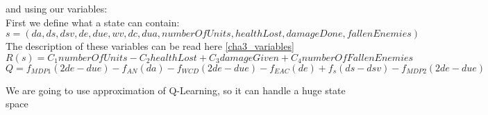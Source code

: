 and using our variables:\\
First we define what a state can contain:\\
$s = {(da, ds, dsv, de, due, wv, dc, dua, numberOfUnits, healthLost, damageDone, fallenEnemies)}$
The description of these variables can be read here \ref{cha3_variables}
$R(s) = C_1 numberOfUnits - C_2 healthLost +  C_3 damageGiven +  C_4 numberOfFallenEnemies$\\

$Q = f_{MDP1} (2de - due)-f_{AN}(da)-f_{WCD}(2de-due)-f_{EAC}(de)+f_s(ds-dsv)-f_{MDP2}(2de-due)$



We are going to use approximation of Q-Learning, so it can handle a huge state space



